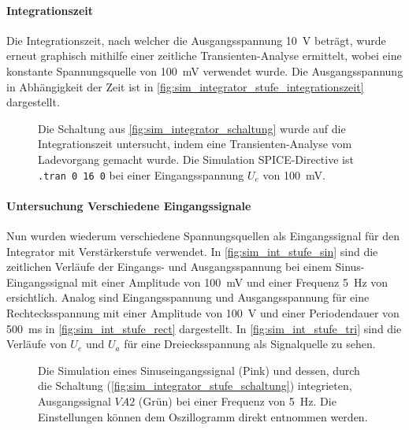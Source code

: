 \documentclass[12pt,english,ngerman]{scrartcl}
\begin{document}
\paragraph{Integrationszeit}
Die Integrationszeit, nach welcher die Ausgangsspannung \SI{10}{\volt} beträgt,
wurde erneut graphisch mithilfe einer zeitliche Transienten-Analyse ermittelt,
wobei eine konstante Spannungsquelle von \SI{100}{\milli\volt} verwendet wurde.
Die Ausgangsspannung in Abhängigkeit der Zeit ist in
\autoref{fig:sim_integrator_stufe_integrationszeit} dargestellt.

\begin{figure}[H]
  \centering
  \caption{Die Schaltung aus \autoref{fig:sim_integrator_schaltung} wurde auf
  die Integrationszeit untersucht, indem eine Transienten-Analyse vom
  Ladevorgang gemacht wurde. Die Simulation SPICE-Directive ist \texttt{.tran 0 16 0} 
  bei einer Eingangsspannung $U_e$ von \SI{100}{\milli\volt}.}
  \label{fig:sim_integrator_stufe_integrationszeit}
\end{figure}

\paragraph{Untersuchung Verschiedene Eingangssignale}
Nun wurden wiederum verschiedene Spannungsquellen als Eingangssignal für den
Integrator mit Verstärkerstufe verwendet. In \autoref{fig:sim_int_stufe_sin}
sind die zeitlichen Verläufe der Eingangs- und Ausgangsspannung bei einem
Sinus-Eingangssignal mit einer Amplitude von \SI{100}{\milli\volt} und einer
Frequenz \SI{5}{\hertz} von ersichtlich. Analog sind Eingangsspannung und
Ausgangsspannung für eine Rechtecksspannung mit einer Amplitude von
\SI{100}{\volt} und einer Periodendauer von \SI{500}{\milli\second} in
\autoref{fig:sim_int_stufe_rect} dargestellt. In
\autoref{fig:sim_int_stufe_tri} sind die Verläufe von $U_e$ und $U_a$ für eine
Dreiecksspannung als Signalquelle zu sehen.

\begin{figure}[H]
  \centering
  \caption{Die Simulation eines Sinuseingangssignal (Pink) und dessen, durch
  die Schaltung (\autoref{fig:sim_integrator_stufe_schaltung}) integrieten,
  Ausgangssignal $VA2$ (Grün) bei einer Frequenz von \SI{5}{\hertz}. Die
  Einstellungen können dem Oszillogramm direkt entnommen werden.}
  \label{fig:sim_int_stufe_sin}
\end{figure}
\end{document}
